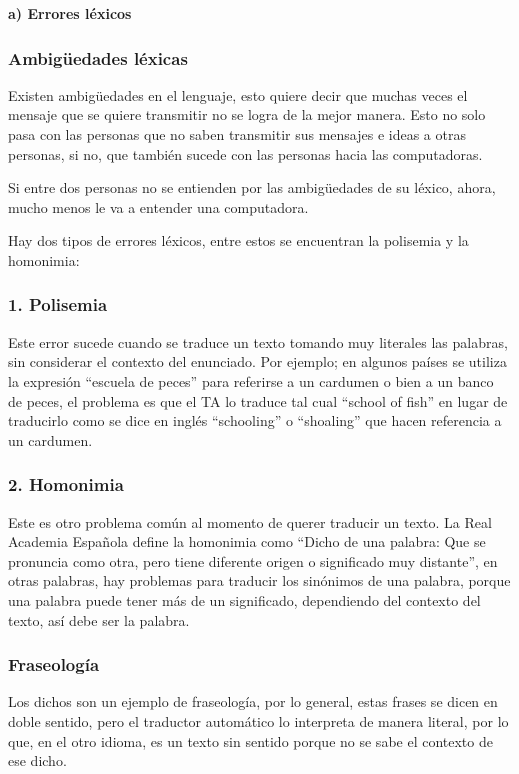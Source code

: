 \documentclass[conference]{IEEEtran}
\begin{document}
 \textbf{a) Errores léxicos}
 \subsubsection{Ambigüedades léxicas}
 Existen ambigüedades en el lenguaje, esto quiere decir que muchas veces el mensaje que se quiere transmitir no se logra de la mejor manera. Esto no solo pasa con las personas que no saben transmitir sus mensajes e ideas a otras personas, si no, que también sucede con las personas hacia las computadoras.
 
 Si entre dos personas no se entienden por las ambigüedades de su léxico, ahora, mucho menos le va a entender una computadora.

 Hay dos tipos de errores léxicos, entre estos se encuentran la polisemia y la homonimia:
 
\subsubsection*{1. Polisemia}Este error sucede cuando se traduce un texto tomando muy literales las palabras, sin considerar el contexto del enunciado. Por ejemplo; en algunos países se utiliza la expresión “escuela de peces” para referirse a un cardumen o bien a un banco de peces, el problema es que el TA lo traduce tal cual “school of fish” en lugar de traducirlo como se dice en inglés “schooling” o “shoaling” que hacen referencia a un cardumen.

\subsubsection*{2. Homonimia}Este es otro problema común al momento de querer traducir un texto. La Real Academia Española define la homonimia como “Dicho de una palabra: Que se pronuncia como otra, pero tiene diferente origen o significado muy distante”, en otras palabras, hay problemas para traducir los sinónimos de una palabra, porque una palabra puede tener más de un significado, dependiendo del contexto del texto, así debe ser la palabra.

\subsubsection{Fraseología}
Los dichos son un ejemplo de fraseología, por lo general, estas frases se dicen en doble sentido, pero el traductor automático lo interpreta de manera literal, por lo que, en el otro idioma, es un texto sin sentido porque no se sabe el contexto de ese dicho.
\end{document}
